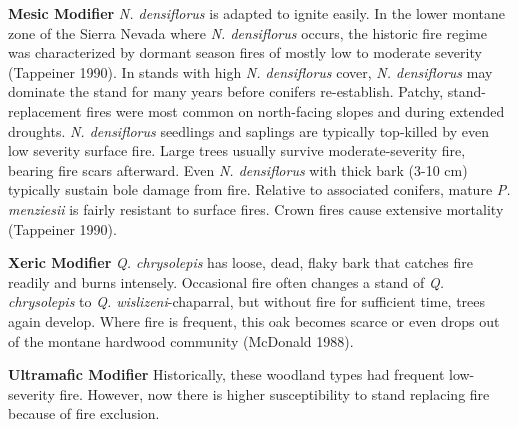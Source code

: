 \begin{adjustwidth}{2cm}{}
\textbf{Mesic Modifier }
\emph{N. densiflorus} is adapted to ignite easily. In the lower montane zone of the Sierra Nevada where \emph{N. densiflorus} occurs, the historic fire regime was characterized by dormant season fires of mostly low to moderate severity (Tappeiner 1990). In stands with high \emph{N. densiflorus} cover, \emph{N. densiflorus} may dominate the stand for many years before conifers re-establish. Patchy, stand-replacement fires were most common on north-facing slopes and during extended droughts. \emph{N. densiflorus} seedlings and saplings are typically top-killed by even low severity surface fire. Large trees usually survive moderate-severity fire, bearing fire scars afterward. Even \emph{N. densiflorus} with thick bark (3-10 cm) typically sustain bole damage from fire. Relative to associated conifers, mature \emph{P. menziesii} is fairly resistant to surface fires. Crown fires cause extensive mortality (Tappeiner 1990).

\medskip
\noindent \textbf{Xeric Modifier} \emph{Q. chrysolepis} has loose, dead, flaky bark that catches fire readily and burns intensely. Occasional fire often changes a stand of \emph{Q. chrysolepis} to \emph{Q. wislizeni}-chaparral, but without fire for sufficient time, trees again develop. Where fire is frequent, this oak becomes scarce or even drops out of the montane hardwood community (McDonald 1988).

\medskip
\noindent \textbf{Ultramafic Modifier} Historically, these woodland types had frequent low-severity fire. However, now there is higher susceptibility to stand replacing fire because of fire exclusion.

\end{adjustwidth}



